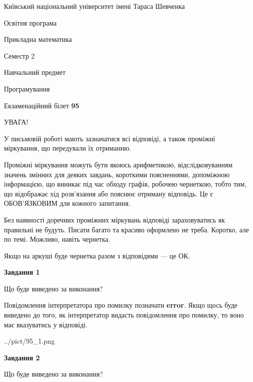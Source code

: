 \documentclass[12pt, ukrainian]{article}
\begin{document}
{{\begin {small}\par
{ \center  Київський національний університет імені Тараса Шевченка \par}
{\parbox {5 cm}{Освітня програма \hfill}{\parbox {7 cm}{Прикладна математика \hfill}}\parbox {6 cm}{\hfill Семестр 2}}\par
{\parbox {5 cm} {Навчальний предмет \hfill}\parbox {7 cm}{Програмування \hfill}\parbox {6cm}{\hfill}\par}\vspace{-7pt} \end{small}}{\center Екзаменаційний білет \No \textbf
{ 95 }\par}}
{
\begin {large}
УВАГА!

У письмовій роботі мають зазначатися всі відповіді, а також проміжні міркування, що передували їх отриманню.

Проміжні міркування можуть бути якоюсь арифметикою, відслідковуванням зна\-чень змінних для деяких завдань,
короткими поясненнями, допоміжною інформацією, що виникає під час обходу графів, робочею чернеткою,
тобто тим, що відображає хід розв’язання або пояснює отриману відповідь.
Це є ОБОВ’ЯЗКОВИМ для кожного запитання.

Без наявності доречних проміжних міркувань відповіді зараховуватись як правиль\-ні не будуть.
Писати багато та красиво оформлено не треба. Коротко, але по темі. Можли\-во, навіть чернетка.

Якщо на аркуші буде чернетка разом з відповідями --- це ОК.

\newpage

{\begin {center}\textbf{Завдання 1}\end {center}}\par
Що буде виведено за виконання?

Повідомлення інтерпретатора про помилку позначати \textbf{error}.
Якщо щось буде виведено до того, як інтерпретатор видасть повідомлення про помилку, 
то воно має вказуватись у відповіді. \par


\begin{center}
	{../pict/95_1.png}
\end{center}
\newpage

{\begin {center}\textbf{Завдання 2}\end {center}}\par
Що буде виведено за виконання?


\end{large}}
\end{document}
